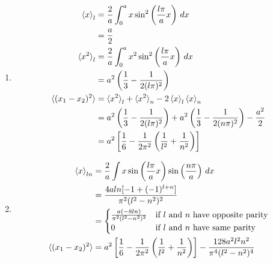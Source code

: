 \documentclass{article}
\begin{document}
\begin{enumerate}
  \item

        \begin{align*}
          \braket{x}_l           & = \frac{2}{a} \int_0^a x \sin^2 \left( \frac{l \pi}{a} x \right) \,d x                                                            \\
                                 & = \frac{a}{2}                                                                                                                     \\
          \braket{x^2}_l         & = \frac{2}{a} \int_0^a x^2 \sin^2 \left( \frac{l \pi}{a} x \right) \,d x                                                          \\
                                 & = a^2 \left( \frac{1}{3} - \frac{1}{2 (l \pi)^2} \right)                                                                          \\
          \braket{(x_1 - x_2)^2} & = \braket{x^2}_l + \braket{x^2}_n - 2 \braket{x}_l \braket{x}_n                                                                   \\
                                 & = a^2 \left( \frac{1}{3} - \frac{1}{2 (l \pi)^2} \right) + a^2 \left( \frac{1}{3} - \frac{1}{2 (n \pi)^2} \right) - \frac{a^2}{2} \\
                                 & = a^2 \left[ \frac{1}{6} - \frac{1}{2 \pi^2} \left( \frac{1}{l^2} + \frac{1}{n^2} \right) \right]
        \end{align*}

  \item

        \begin{align*}
          \braket{x}_{l n}       & = \frac{2}{a} \int x \sin \left( \frac{l \pi}{a} x \right) \sin \left( \frac{n \pi}{a} \right) \,d x                                            \\
                                 & = \frac{4 a l n [-1 + (-1)^{l + n}]}{\pi^2 (l^2 - n^2)^2}                                                                                       \\
                                 & = \begin{cases}
                                       \frac{a (-8 l n)}{\pi^2 (l^2 - n^2)^2} & \text{if } l \text{ and } n \text{ have opposite parity} \\
                                       0                                      & \text{if } l \text{ and } n \text{ have same parity}
                                     \end{cases}                                             \\
          \braket{(x_1 - x_2)^2} & = a^2 \left[ \frac{1}{6} - \frac{1}{2 \pi^2} \left( \frac{1}{l^2} + \frac{1}{n^2} \right) \right] - \frac{128 a^2 l^2 n^2}{\pi^4 (l^2 - n^2)^4}
        \end{align*}


\end{enumerate}
\end{document}
